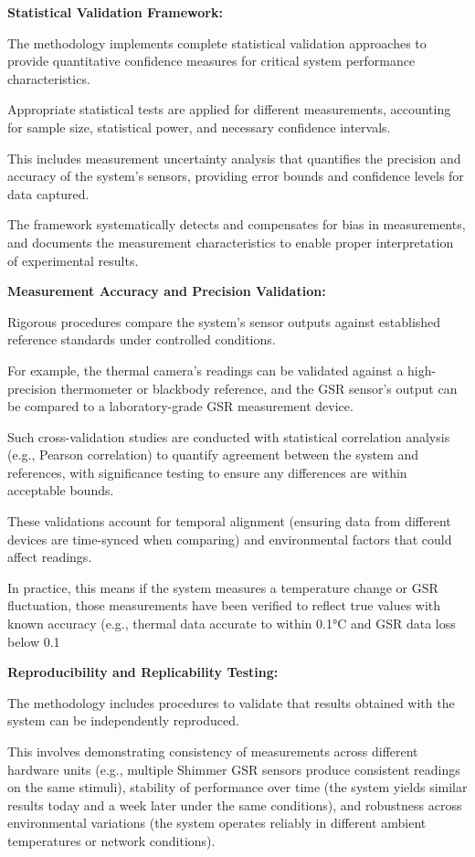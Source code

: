 \textbf{Statistical Validation Framework:}

The methodology implements complete statistical validation approaches to provide quantitative confidence measures for critical system performance characteristics.

Appropriate statistical tests are applied for different measurements, accounting for sample size, statistical power, and necessary confidence intervals.

This includes measurement uncertainty analysis that quantifies the precision and accuracy of the system's sensors, providing error bounds and confidence levels for data captured.

The framework systematically detects and compensates for bias in measurements, and documents the measurement characteristics to enable proper interpretation of experimental results.

\textbf{Measurement Accuracy and Precision Validation:}

Rigorous procedures compare the system's sensor outputs against established reference standards under controlled conditions.

For example, the thermal camera's readings can be validated against a high-precision thermometer or blackbody reference, and the GSR sensor's output can be compared to a laboratory-grade GSR measurement device.

Such cross-validation studies are conducted with statistical correlation analysis (e.g., Pearson correlation) to quantify agreement between the system and references, with significance testing to ensure any differences are within acceptable bounds.

These validations account for temporal alignment (ensuring data from different devices are time-synced when comparing) and environmental factors that could affect readings.

In practice, this means if the system measures a temperature change or GSR fluctuation, those measurements have been verified to reflect true values with known accuracy (e.g., thermal data accurate to within 0.1°C and GSR data loss below 0.1%

\textbf{Reproducibility and Replicability Testing:}

The methodology includes procedures to validate that results obtained with the system can be independently reproduced.

This involves demonstrating consistency of measurements across different hardware units (e.g., multiple Shimmer GSR sensors produce consistent readings on the same stimuli), stability of performance over time (the system yields similar results today and a week later under the same conditions), and robustness across environmental variations (the system operates reliably in different ambient temperatures or network conditions).

